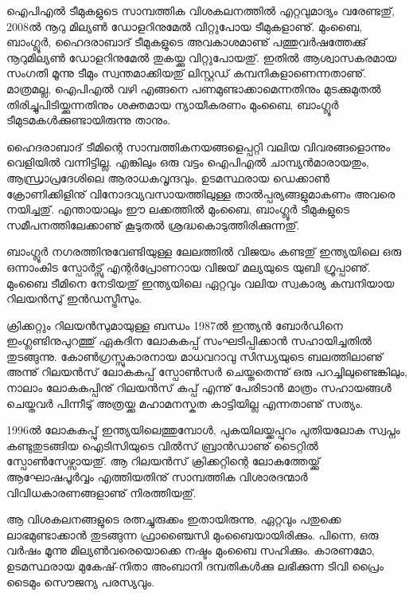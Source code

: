 \vskip 1pt

ഐപിഎല്‍ ടീമുകളുടെ സാമ്പത്തിക വിശകലനത്തില്‍ എറ്റവുമാദ്യം വരേണ്ടതു്, 2008ല്‍ നൂറു മില്യണ്‍ ഡോളറിനുമേല്‍ 
വിറ്റുപോയ ടീമുകളാണു്. മുംബൈ, ബാംഗ്ലൂര്‍, ഹൈദരാബാദ് ടീമുകളുടെ അവകാശമാണു് പത്തുവര്‍ഷത്തേക്കു് 
നൂറുമില്യണ്‍ ഡോളറിനുമേല്‍ തുകയ്ക്കു വിറ്റുപോയതു്. ഇതില്‍ ആശ്വാസകരമായ സംഗതി മൂന്നു ടീമും സ്വന്തമാക്കിയതു് 
ലിസ്റ്റഡ് കമ്പനികളാണെന്നതാണു്. മാത്രമല്ല, ഐപിഎല്‍ വഴി എങ്ങനെ പണമുണ്ടാക്കാമെന്നതിനും 
മുടക്കുമുതല്‍ തിരിച്ചുപിടിയ്ക്കുന്നതിനും ശക്തമായ ന്യായീകരണം മുംബൈ, ബാംഗ്ലൂര്‍ ടീമുടമകള്‍ക്കുണ്ടായിരുന്നു താനും. 

ഹൈദരാബാദ് ടീമിന്റെ സാമ്പത്തികനയങ്ങളെപ്പറ്റി വലിയ വിവരങ്ങളൊന്നും വെളിയില്‍ വന്നിട്ടില്ല. എങ്കിലും ഒരു വട്ടം 
ഐപിഎല്‍ ചാമ്പ്യന്‍മാരായതും, ആന്ധ്രാപ്രദേശിലെ ആരാധകവൃന്ദവും, ഉടമസ്ഥരായ ഡെക്കാണ്‍ ക്രോണിക്കിളിനു് 
വിനോദവ്യവസായത്തിലുള്ള താല്‍പ്പര്യങ്ങളുമാകണം അവരെ നയിച്ചതു്. എന്തായാലും ഈ ലക്കത്തില്‍ മുംബൈ, 
ബാംഗ്ലൂര്‍ ടീമുകളുടെ സമീപനത്തിലേക്കാണു് കൂടുതല്‍ ശ്രദ്ധകൊടുത്തിരിക്കുന്നതു്.

ബാംഗ്ലൂര്‍ നഗരത്തിനുവേണ്ടിയുള്ള ലേലത്തില്‍ വിജയം കണ്ടതു് ഇന്ത്യയിലെ ഒരു ഒന്നാംകിട സ്പോര്‍ട്സു് എന്റര്‍പ്രോണറായ 
വിജയ് മല്യയുടെ യുബി ഗ്രൂപ്പാണു്. മുംബൈ ടീമിനെ നേടിയതു് ഇന്ത്യയിലെ ഏറ്റവും വലിയ സ്വകാര്യ കമ്പനിയായ റിലയന്‍സു് 
ഇന്‍ഡസ്ട്രീസും.


ക്രിക്കറ്റും റിലയന്‍സുമായുള്ള ബന്ധം 1987ല്‍ ഇന്ത്യന്‍ ബോര്‍ഡിനെ ഇംഗ്ലണ്ടിനുപുറത്തു് ഏകദിന ലോകകപ്പ് 
സംഘടിപ്പിക്കാന്‍ സഹായിച്ചതില്‍ തുടങ്ങുന്നു. കോണ്‍ഗ്രസ്സുകാരനായ മാധവറാവു സിന്ധ്യയുടെ ബലത്തിലാണു് 
അന്നു് റിലയന്‍സ് ലോകകപ്പ് സ്പോണ്‍സര്‍ ചെയ്തതെന്നു് ഒരു പറച്ചിലുണ്ടെങ്കിലും, നാലാം ലോകകപ്പിനു് റിലയന്‍സ് 
കപ്പ് എന്നു് പേരിടാന്‍ മാത്രം സഹായങ്ങള്‍ ചെയ്തവര്‍ പിന്നീടു് അത്രയ്ക്കു മഹാമനസ്കത കാട്ടിയില്ല എന്നതാണു് സത്യം.

1996ല്‍ ലോകകപ്പു് ഇന്ത്യയിലെത്തുമ്പോള്‍, പുകയിലയ്ക്കപ്പുറം പുതിയലോക സ്വപ്നം കണ്ടുതുടങ്ങിയ ഐടിസിയുടെ 
വില്‍സ് ബ്രാന്‍ഡാണു് ടൈറ്റില്‍ സ്പോണ്‍സേഴ്സായതു്. ആ റിലയന്‍സ് ക്രിക്കറ്റിന്റെ ലോകത്തേയ്ക്കു് ആഘോഷപൂര്‍‌വ്വം 
എത്തിയതിനു് സാമ്പത്തിക വിശാരദന്മാര്‍ വിവിധകാരണങ്ങളാണു് നിരത്തിയതു്.

ആ വിശകലനങ്ങളുടെ രത്നച്ചുരുക്കം ഇതായിരുന്നു, ഏറ്റവും പതുക്കെ ലാഭമുണ്ടാക്കാന്‍ തുടങ്ങുന്ന ഫ്രാഞ്ചൈസി 
മുംബൈയായിരിക്കും. പിന്നെ, ഒരു വര്‍ഷം മൂന്നു മില്യണ്‍വരെയൊക്കെ നഷ്ടം മുംബൈ സഹിക്കും. കാരണമോ, 
ഉടമസ്ഥരായ മുകേഷ്-നിതാ അംബാനി ദമ്പതികള്‍ക്കു ലഭിക്കുന്ന ടിവി പ്രൈം ടൈമും സൌജന്യ പരസ്യവും.


